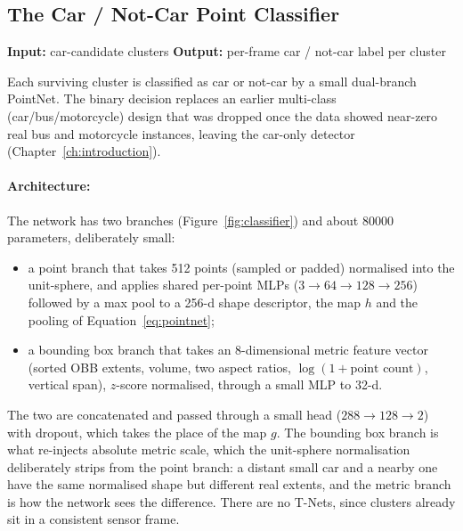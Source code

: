 \subsection{The Car / Not-Car Point Classifier}
\label{sec:pipeline-classifier}

\noindent \textbf{Input:} car-candidate clusters \quad \textbar \quad \textbf{Output:} per-frame car / not-car label per cluster \vspace{0.5em}

Each surviving cluster is classified as car or not-car by a small
dual-branch PointNet. The binary decision
replaces
an earlier multi-class (car/bus/motorcycle) design that was dropped once the data
showed near-zero real bus and motorcycle instances, leaving the car-only detector
(Chapter~\ref{ch:introduction}).

\paragraph{Architecture:} The network has two branches
(Figure~\ref{fig:classifier}) and about \num{80000}
parameters, deliberately small:
\begin{itemize}
  \item a point branch that takes \num{512} points (sampled or padded)
    normalised into the unit-sphere, and applies shared per-point MLPs
    ($3 \to 64 \to 128 \to 256$) followed by a max pool to a \num{256}-d shape
    descriptor, the map $h$ and the pooling of Equation~\eqref{eq:pointnet};
  \item a bounding box branch that takes an \num{8}-dimensional metric
    feature vector (sorted OBB extents, volume, two aspect ratios,
    $\log(1+\text{point count})$, vertical span), $z$-score normalised, through a
    small MLP to \num{32}-d.
\end{itemize}
The two are concatenated and passed through a small head
($288 \to 128 \to 2$) with dropout, which takes the place of the map $g$. The bounding box branch is what re-injects
absolute metric scale, which the unit-sphere normalisation deliberately strips
from the point branch: a distant small car and a nearby one have the same
normalised shape but different real extents, and the metric branch is how the
network sees the difference. There are no T-Nets, since clusters already sit in a
consistent sensor frame.


